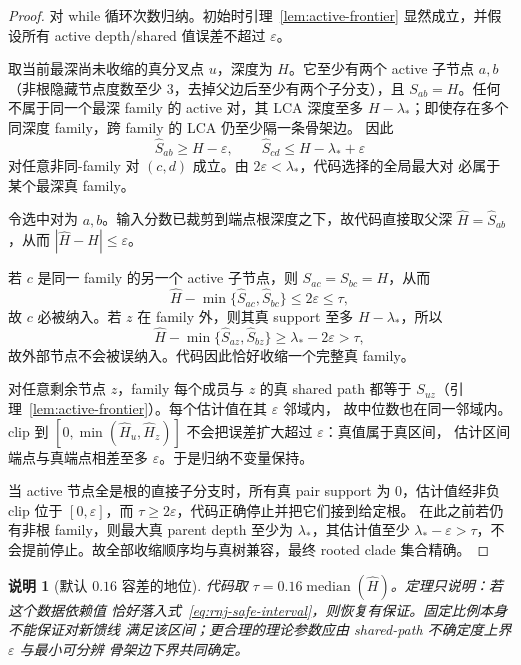 \documentclass[UTF8,11pt]{ctexart}
\newtheorem{remark}[definition]{说明}
\begin{document}
\begin{proof}
对 while 循环次数归纳。初始时引理~\ref{lem:active-frontier} 显然成立，并假设所有
active depth/shared 值误差不超过 $\varepsilon$。

取当前最深尚未收缩的真分叉点 $u$，深度为 $H$。它至少有两个 active 子节点
$a,b$（非根隐藏节点度数至少 $3$，去掉父边后至少有两个子分支），且
$S_{ab}=H$。任何不属于同一个最深 family 的 active 对，其 LCA 深度至多
$H-\lambda_*$；即使存在多个同深度 family，跨 family 的 LCA 仍至少隔一条骨架边。
因此
\begin{equation*}
 \widehat S_{ab}\ge H-\varepsilon,
 \qquad
 \widehat S_{cd}\le H-\lambda_*+\varepsilon
\end{equation*}
对任意非同-family 对 $(c,d)$ 成立。由 $2\varepsilon<\lambda_*$，代码选择的全局最大对
必属于某个最深真 family。

令选中对为 $a,b$。输入分数已裁剪到端点根深度之下，故代码直接取父深
$\widehat H=\widehat S_{ab}$，从而 $|\widehat H-H|\le\varepsilon$。

若 $c$ 是同一 family 的另一个 active 子节点，则
$S_{ac}=S_{bc}=H$，从而
\begin{equation*}
 \widehat H-\min\{\widehat S_{ac},\widehat S_{bc}\}
 \le2\varepsilon\le\tau,
\end{equation*}
故 $c$ 必被纳入。若 $z$ 在 family 外，则其真 support 至多
$H-\lambda_*$，所以
\begin{equation*}
 \widehat H-\min\{\widehat S_{az},\widehat S_{bz}\}
 \ge\lambda_*-2\varepsilon>\tau,
\end{equation*}
故外部节点不会被误纳入。代码因此恰好收缩一个完整真 family。

对任意剩余节点 $z$，family 每个成员与 $z$ 的真 shared path 都等于
$S_{uz}$（引理~\ref{lem:active-frontier}）。每个估计值在其 $\varepsilon$ 邻域内，
故中位数也在同一邻域内。clip 到
$[0,\min(\widehat H_u,\widehat H_z)]$ 不会把误差扩大超过 $\varepsilon$：真值属于真区间，
估计区间端点与真端点相差至多 $\varepsilon$。于是归纳不变量保持。

当 active 节点全是根的直接子分支时，所有真 pair support 为 $0$，估计值经非负 clip
位于 $[0,\varepsilon]$，而 $\tau\ge2\varepsilon$，代码正确停止并把它们接到给定根。
在此之前若仍有非根 family，则最大真 parent depth 至少为 $\lambda_*$，其估计值至少
$\lambda_*-\varepsilon>\tau$，不会提前停止。故全部收缩顺序均与真树兼容，最终 rooted
clade 集合精确。
\end{proof}

\begin{remark}[默认 $0.16$ 容差的地位]
代码取 $\tau=0.16\operatorname{median}(\widehat H)$。定理只说明：若这个数据依赖值
恰好落入式~\eqref{eq:rnj-safe-interval}，则恢复有保证。固定比例本身不能保证对新馈线
满足该区间；更合理的理论参数应由 shared-path 不确定度上界 $\varepsilon$ 与最小可分辨
骨架边下界共同确定。
\end{remark}
\end{document}
